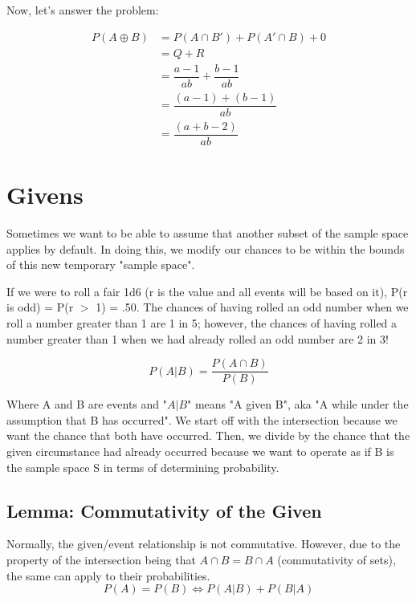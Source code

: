 \documentclass[]{article}
\begin{document}
Now, let's answer the problem:

\begin{align*}
P(A \oplus B) &= P(A \cap B') + P(A' \cap B) + 0 \\
              &= Q + R \\
              &= \dfrac{a - 1}{ab} + \dfrac{b - 1}{ab} \\
              &= \dfrac{(a-1) + (b-1)}{ab} \\
              &= \dfrac{(a + b - 2)}{ab}
\end{align*}
\pagebreak
\section{Givens}
Sometimes we want to be able to assume that another subset of the sample space applies by default. In doing this, we modify our chances to be within the bounds of this new temporary "sample space".

If we were to roll a fair 1d6 (r is the value and all events will be based on it), P(r is odd) = P(r $>$ 1) = .50. The chances of having rolled an odd number when we roll a number greater than 1 are 1 in 5; however, the chances of having rolled a number greater than 1 when we had already rolled an odd number are 2 in 3!

\begin{equation}
	P(A|B) = \dfrac{P(A\cap B)}{P(B)}
\end{equation}

Where A and B are events and "$A|B$" means "A given B", aka "A while under the assumption that B has occurred". We start off with the intersection because we want the chance that both have occurred. Then, we divide by the chance that the given circumstance had already occurred because we want to operate as if B is the sample space S in terms of determining probability.

\subsection{Lemma: Commutativity of the Given}
Normally, the given/event relationship is not commutative. However, due to the property of the intersection being that $A \cap B = B \cap A$ (commutativity of sets), the same can apply to their probabilities.
\begin{equation}
	P(A) = P(B) \iff P(A|B) + P(B|A)
\end{equation}
\end{document}
